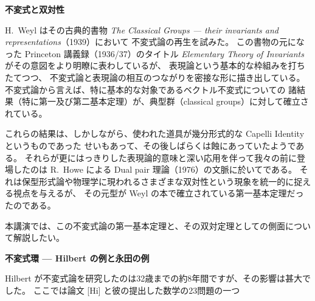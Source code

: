 \documentclass[uplatex,dvipdfmx]{jlreq}
\begin{document}
\newpage

\begin{center}
  {\Large\bfseries 不変式と双対性}
\end{center}

\bigskip
\hspace*{\fill}{\large\bfseries 梅田　亨（京大・理）}

\bigskip

H.~Weyl はその古典的書物
\textit{The Classical Groups --- their invariants and representations}（1939）において
不変式論の再生を試みた。
この書物の元になった Princeton 講義録（1936/37）のタイトル
\textit{Elementary Theory of Invariants} がその意図をより明瞭に表わしているが、
表現論という基本的な枠組みを打ちたてつつ、
不変式論と表現論の相互のつながりを密接な形に描き出している。
不変式論から言えば、特に基本的な対象であるベクトル不変式についての
諸結果（特に第一及び第二基本定理）が、典型群（classical groups）に対して確立されている。

\medskip

これらの結果は、しかしながら、使われた道具が幾分形式的な Capelli Identity というものであった
せいもあって、その後しばらくは蝕にあっていたようである。
それらが更にはっきりした表現論的意味と深い応用を伴って我々の前に登場したのは
R.~Howe による Dual pair 理論（1976）の文脈に於いてである。
それは保型形式論や物理学に現われるさまざまな双対性という現象を統一的に捉える視点を与えるが、
その元型が Weyl の本で確立されている第一基本定理だったのである。

\medskip

本講演では、この不変式論の第一基本定理と、その双対定理としての側面について解説したい。

\newpage

\begin{center}
  {\Large\bfseries 不変式環 --- Hilbert の例と永田の例}
\end{center}

\bigskip
\hspace*{\fill}{\large\bfseries 向井　茂}

\bigskip

Hilbert が不変式論を研究したのは32歳までの約8年間ですが、その影響は甚大でした。
ここでは論文 [Hi] と彼の提出した数学の23問題の一つ
\end{document}
